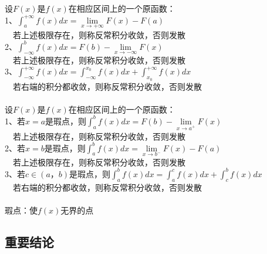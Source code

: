 \documentclass{article}
\begin{document}
\begin{flushleft}
	设$F(x)$是$f(x)$在相应区间上的一个原函数：\\
	1、$\int_{a}^{+\infty}f(x)dx=\lim\limits_{x\to+\infty}F(x)-F(a)$\\
	\ \ 若上述极限存在，则称反常积分收敛，否则发散\\
	2、$\int_{-\infty}^{b}f(x)dx=F(b)-\lim\limits_{x\to-\infty}F(x)$\\
	\ \ 若上述极限存在，则称反常积分收敛，否则发散\\
	3、$\int_{-\infty}^{+\infty}f(x)dx=\int_{-\infty}^{x_0}f(x)dx+\int_{x_0}^{+\infty}f(x)dx$\\
	\ \ 若右端的积分都收敛，则称反常积分收敛，否则发散\\
	~\\
	设$F(x)$是$f(x)$在相应区间上的一个原函数：\\
	1、若$x=a$是瑕点，则$\int_{a}^{b}f(x)dx=F(b)-\lim\limits_{x\to a^+}F(x)$\\
	\ \ 若上述极限存在，则称反常积分收敛，否则发散\\
	2、若$x=b$是瑕点，则$\int_{a}^{b}f(x)dx=\lim\limits_{x\to b^-}F(x)-F(a)$\\
	\ \ 若上述极限存在，则称反常积分收敛，否则发散\\
	3、若$c\in(a，b)$是瑕点，则$\int_{a}^{b}f(x)dx=\int_{a}^{c}f(x)dx+\int_{c}^{b}f(x)dx$\\
	\ \ 若右端的积分都收敛，则称反常积分收敛，否则发散\\
	~\\
	瑕点：使$f(x)$无界的点\\
	
	\subsection{重要结论}
	

\end{flushleft}
\end{document}
